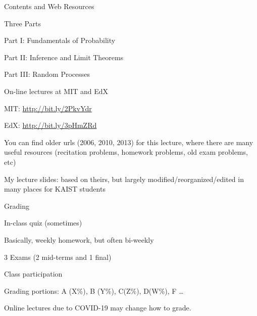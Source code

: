 \documentclass[fleqn,aspectratio=169]{beamer}
\begin{document}
\begin{frame}{Contents and Web Resources}

\bci 
\item Three Parts

\bci
\item Part I: Fundamentals of Probability
\item Part II: Inference and Limit Theorems
\item Part III: Random Processes
\eci

\item On-line lectures at MIT and EdX
\bci
\item MIT: \url{http://bit.ly/2PkvYdr}
\item EdX: \url{http://bit.ly/3pHmZRd}
\item You can find older urls (2006, 2010, 2013) for this lecture, where there are many useful resources (recitation problems, homework problems, old exam problems, etc)

\medskip
\item My lecture slides: based on theirs, but largely modified/reorganized/edited in many places for KAIST students

\eci

\eci

\end{frame}

\begin{frame}{Grading}

\bci 

\item In-class quiz (sometimes)
\item Basically, weekly homework, but often bi-weekly
\item 3 Exams (2 mid-terms and 1 final)

\bigskip

\item Class participation
\item Grading portions: A (X\%), B (Y\%), C(Z\%), D(W\%), F …


\medskip
\item Online lectures due to COVID-19 may change how to grade.
\eci

\end{frame}
\end{document}

